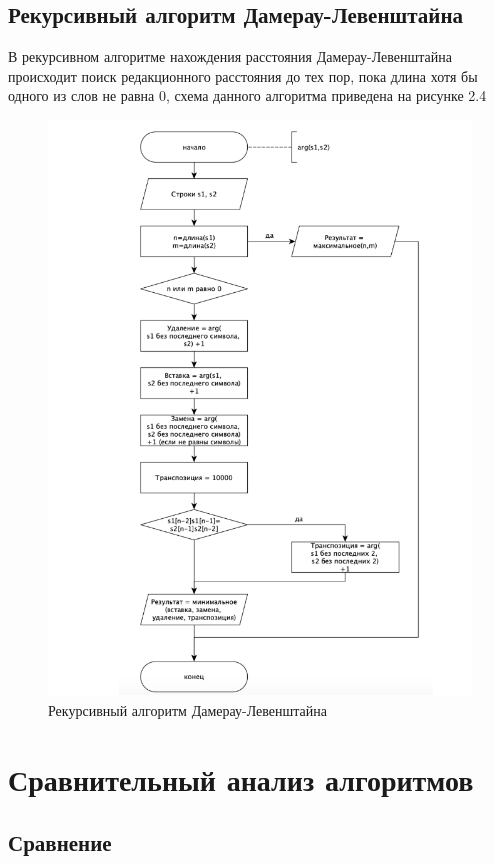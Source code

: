 \subsection{Рекурсивный алгоритм Дамерау-Левенштайна}
В рекурсивном алгоритме нахождения расстояния Дамерау-Левенштайна происходит поиск редакционного расстояния до тех пор, пока длина хотя бы одного из слов не равна 0, схема данного алгоритма приведена на рисунке 2.4
\begin{figure}[H]
\centering
\includegraphics[scale=0.5]{rec}
\caption{Рекурсивный алгоритм Дамерау-Левенштайна}
\end{figure}

\section{Сравнительный анализ алгоритмов}

\subsection{Сравнение}


